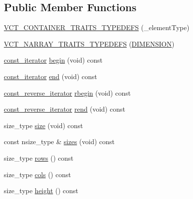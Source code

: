 \subsection*{Public Member Functions}
\begin{DoxyCompactItemize}
\item 
\hyperlink{classvct_dynamic_const_matrix_base_a38e38a492db800c1e9dd024b6f09bb26}{V\-C\-T\-\_\-\-C\-O\-N\-T\-A\-I\-N\-E\-R\-\_\-\-T\-R\-A\-I\-T\-S\-\_\-\-T\-Y\-P\-E\-D\-E\-F\-S} (\-\_\-element\-Type)
\item 
\hyperlink{classvct_dynamic_const_matrix_base_a15bb36089d494e711dd5ebef48523c13}{V\-C\-T\-\_\-\-N\-A\-R\-R\-A\-Y\-\_\-\-T\-R\-A\-I\-T\-S\-\_\-\-T\-Y\-P\-E\-D\-E\-F\-S} (\hyperlink{classvct_dynamic_const_matrix_base_ad4b10a99ce01d58a9d7049bf0f28ee95a7101e5e87be1df37bf896f120fa37d10}{D\-I\-M\-E\-N\-S\-I\-O\-N})
\item 
\hyperlink{classvct_dynamic_const_matrix_base_a665b16a8ecd8b6febb4d193efa42205e}{const\-\_\-iterator} \hyperlink{classvct_dynamic_const_matrix_base_a2b9396d713323d6be33a74c62e73a595}{begin} (void) const 
\item 
\hyperlink{classvct_dynamic_const_matrix_base_a665b16a8ecd8b6febb4d193efa42205e}{const\-\_\-iterator} \hyperlink{classvct_dynamic_const_matrix_base_a40241b13b0e08011e7a7e1a7afb8c91e}{end} (void) const 
\item 
\hyperlink{classvct_dynamic_const_matrix_base_afc30420e745eed5f1c838a01088ddc84}{const\-\_\-reverse\-\_\-iterator} \hyperlink{classvct_dynamic_const_matrix_base_aa549e76e67cf028a4cc2c931b22e7f7d}{rbegin} (void) const 
\item 
\hyperlink{classvct_dynamic_const_matrix_base_afc30420e745eed5f1c838a01088ddc84}{const\-\_\-reverse\-\_\-iterator} \hyperlink{classvct_dynamic_const_matrix_base_a354a18f7aa79151af16791038e02eb3e}{rend} (void) const 
\item 
size\-\_\-type \hyperlink{classvct_dynamic_const_matrix_base_ab9d484f83471aee6512ea614aa54bd0b}{size} (void) const 
\item 
const nsize\-\_\-type \& \hyperlink{classvct_dynamic_const_matrix_base_ab8946f5d9d05321fcadf07f65dc314ce}{sizes} (void) const 
\item 
size\-\_\-type \hyperlink{classvct_dynamic_const_matrix_base_a5eac13be2207ebeb8766cde379d73438}{rows} () const 
\item 
size\-\_\-type \hyperlink{classvct_dynamic_const_matrix_base_aa6c51d41a100da49a7e7ac7edb20ecd9}{cols} () const 
\item 
size\-\_\-type \hyperlink{classvct_dynamic_const_matrix_base_adbd3993425c2d68113e1bc0848bee850}{height} () const 

\end{DoxyCompactItemize}
